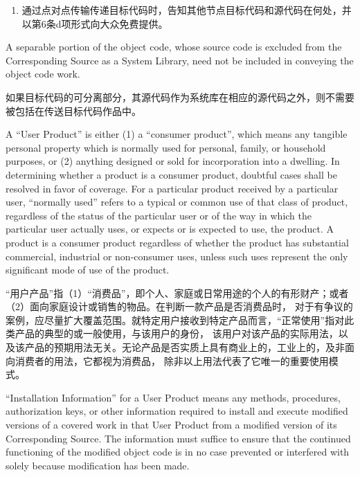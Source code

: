 \documentclass[11pt]{article}
\begin{document}
\begin{enumerate}
\begin{enumerate}
          \item 通过点对点传输传递目标代码时，告知其他节点目标代码和源代码在何处，并以第6条d项形式向大众免费提供。

        \end{enumerate}

        A separable portion of the object code, whose source code is excluded
        from the Corresponding Source as a System Library, need not be
        included in conveying the object code work.

        如果目标代码的可分离部分，其源代码作为系统库在相应的源代码之外，则不需要被包括在传送目标代码作品中。

        A ``User Product'' is either (1) a ``consumer product'', which means any
        tangible personal property which is normally used for personal, family,
        or household purposes, or (2) anything designed or sold for incorporation
        into a dwelling.  In determining whether a product is a consumer product,
        doubtful cases shall be resolved in favor of coverage.  For a particular
        product received by a particular user, ``normally used'' refers to a
        typical or common use of that class of product, regardless of the status
        of the particular user or of the way in which the particular user
        actually uses, or expects or is expected to use, the product.  A product
        is a consumer product regardless of whether the product has substantial
        commercial, industrial or non-consumer uses, unless such uses represent
        the only significant mode of use of the product.

        “用户产品”指（1）“消费品”，即个人、家庭或日常用途的个人的有形财产；或者（2）面向家庭设计或销售的物品。在判断一款产品是否消费品时，
        对于有争议的案例，应尽量扩大覆盖范围。就特定用户接收到特定产品而言，“正常使用”指对此类产品的典型的或一般使用，与该用户的身份，
        该用户对该产品的实际用法，以及该产品的预期用法无关。无论产品是否实质上具有商业上的，工业上的，及非面向消费者的用法，它都视为消费品，
        除非以上用法代表了它唯一的重要使用模式。


        ``Installation Information'' for a User Product means any methods,
        procedures, authorization keys, or other information required to install
        and execute modified versions of a covered work in that User Product from
        a modified version of its Corresponding Source.  The information must
        suffice to ensure that the continued functioning of the modified object
        code is in no case prevented or interfered with solely because
        modification has been made.


\end{enumerate}
\end{document}
